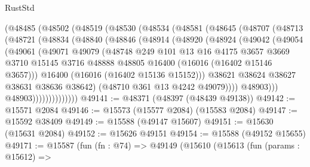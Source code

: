 \begin{lexlean}{RustStd}
\begin{coremodule}
        (@48485
          (@48502
            (@48519
              (@48530
                (@48534
                  (@48581
                    (@48645
                      (@48707
                        (@48713
                          (@48721
                            (@48834
                              (@48840
                                (@48846
                                  (@48914
                                    (@48920
                                      (@48924
                                        (@49042
                                          (@49054
                                            (@49061
                                              (@49071
                                                @49079
                                                (@48748
                                                  @249
                                                  @101
                                                  @13
                                                  @16
                                                  @4175
                                                  @3657
                                                  @3669
                                                  @3710
                                                  @15145
                                                  @3716
                                                  @48888
                                                  @48805
                                                  @16400
                                                  (@16016 (@16402 @15146 @3657)))
                                                @16400
                                                (@16016 (@16402 @15136 @15152)))
                                              @38621
                                              @38624
                                              @38627
                                              @38631
                                              @38636
                                              @38642)
                                            (@48710 @361 @13 @4242 @49079))))
                                      @48903)))
                                @48903))))))))))))))
@49141 := @48371 (@48397 (@48439 @49138))
@49142 := @15571 @2084
@49146 := @15573 (@15577 @2084) (@15583 @2084)
@49147 := @15592 @38409
@49149 := @15588 (@49147 @15607)
@49151 := @15630 (@15631 @2084)
@49152 := @15626 @49151
@49154 := @15588 (@49152 @15655)
@49171 := @15587
    (fun (fn : @74) =>
    @49149
      (@15610
        (@15613
          (fun (params : @15612) =>

\end{coremodule}
\end{lexlean}
